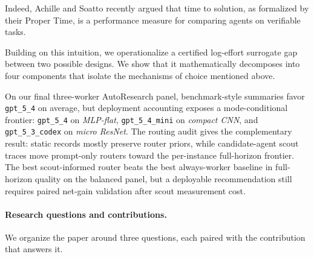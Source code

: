 \documentclass{article}
\begin{document}
Indeed, Achille and Soatto \citep{achille2025agents} recently argued that time to solution, as formalized by their Proper Time, is a performance measure for comparing agents on verifiable tasks.

Building on this intuition, we operationalize a certified log-effort surrogate gap between two possible designs. We show that it mathematically decomposes into four components that isolate the mechanisms of choice mentioned above.

On our final three-worker AutoResearch panel, benchmark-style summaries favor \texttt{gpt\_5\_4} on average, but deployment accounting exposes a mode-conditional frontier: \texttt{gpt\_5\_4} on \textit{MLP-flat}, \texttt{gpt\_5\_4\_mini} on \textit{compact CNN}, and \texttt{gpt\_5\_3\_codex} on \textit{micro ResNet}.
The routing audit gives the complementary result: static records mostly preserve router priors, while candidate-agent scout traces move prompt-only routers toward the per-instance full-horizon frontier.
The best scout-informed router beats the best always-worker baseline in full-horizon quality on the balanced panel, but a deployable recommendation still requires paired net-gain validation after scout measurement cost.

\paragraph{Research questions and contributions.}
We organize the paper around three questions, each paired with the contribution that answers it.
\end{document}
